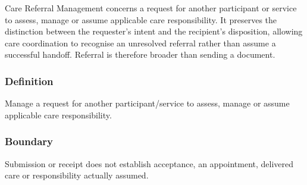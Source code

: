 Care Referral Management concerns a request for another participant or service to assess, manage or assume applicable care responsibility. It preserves the distinction between the requester's intent and the recipient's disposition, allowing care coordination to recognise an unresolved referral rather than assume a successful handoff. Referral is therefore broader than sending a document.

\subsubsection*{Definition}

Manage a request for another participant/\allowbreak{}service to assess, manage or assume applicable care responsibility.

\subsubsection*{Boundary}

Submission or receipt does not establish acceptance, an appointment, delivered care or responsibility actually assumed.

